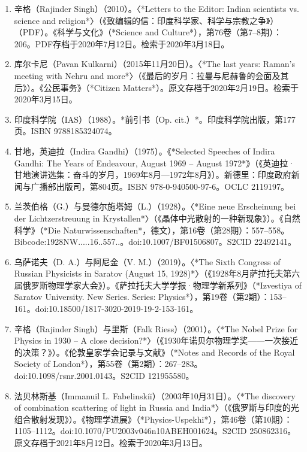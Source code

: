 \begin{enumerate}
\item 辛格（Rajinder Singh）（2010）。〈*Letters to the Editor: Indian scientists vs. science and religion*〉（《致编辑的信：印度科学家、科学与宗教之争》）（PDF）。《科学与文化》（*Science and Culture*），第76卷（第7–8期）：206。PDF存档于2020年7月12日。检索于2020年3月18日。

\item 库尔卡尼（Pavan Kulkarni）（2015年11月20日）。〈*The last years: Raman's meeting with Nehru and more*〉（《最后的岁月：拉曼与尼赫鲁的会面及其后》）。《公民事务》（*Citizen Matters*）。原文存档于2020年2月19日。检索于2020年3月15日。

\item 印度科学院（IAS）（1988）。*前引书（Op. cit.）*。印度科学院出版，第177页。ISBN 9788185324074。

\item 甘地，英迪拉（Indira Gandhi）（1975）。《*Selected Speeches of Indira Gandhi: The Years of Endeavour, August 1969 – August 1972*》（《英迪拉·甘地演讲选集：奋斗的岁月，1969年8月—1972年8月》）。新德里：印度政府新闻与广播部出版司，第804页。ISBN 978-0-940500-97-6。OCLC 2119197。

\item 兰茨伯格（G.）与曼德尔施塔姆（L.）（1928）。〈*Eine neue Erscheinung bei der Lichtzerstreuung in Krystallen*〉（《晶体中光散射的一种新现象》）。《自然科学》（*Die Naturwissenschaften*，德文），第16卷（第28期）：557–558。Bibcode:1928NW.....16..557..。doi:10.1007/BF01506807。S2CID 22492141。

\item 乌萨诺夫（D. A.）与阿尼金（V. M.）（2019）。〈*The Sixth Congress of Russian Physicists in Saratov (August 15, 1928)*〉（《1928年8月萨拉托夫第六届俄罗斯物理学家大会》）。《萨拉托夫大学学报·物理学新系列》（*Izvestiya of Saratov University. New Series. Series: Physics*），第19卷（第2期）：153–161。doi:10.18500/1817-3020-2019-19-2-153-161。

\item 辛格（Rajinder Singh）与里斯（Falk Riess）（2001）。〈*The Nobel Prize for Physics in 1930 – A close decision?*〉（《1930年诺贝尔物理学奖——一次接近的决策？》）。《伦敦皇家学会记录与文献》（*Notes and Records of the Royal Society of London*），第55卷（第2期）：267–283。doi:10.1098/rsnr.2001.0143。S2CID 121955580。

\item 法贝林斯基（Immanuil L. Fabelinskiĭ）（2003年10月31日）。〈*The discovery of combination scattering of light in Russia and India*〉（《俄罗斯与印度的光组合散射发现》）。《物理学进展》（*Physics-Uspekhi*），第46卷（第10期）：1105–1112。doi:10.1070/PU2003v046n10ABEH001624。S2CID 250862316。原文存档于2021年8月12日。检索于2020年3月13日。


\end{enumerate}
